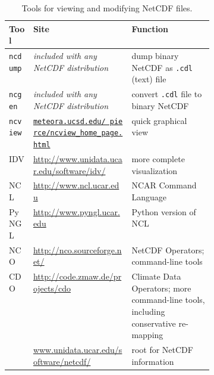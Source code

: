 \newcommand{\netcdftool}[1]{#1\index{NetCDF!tools!#1}}
\begin{table}[ht]
\centering
\small
\begin{tabular}{llp{0.4\linewidth}}
  \toprule
  \textbf{Tool} & \textbf{Site} & \textbf{Function} \\
  \midrule
  \netcdftool{\texttt{ncdump}} & \emph{included with any NetCDF distribution} & dump binary NetCDF as \texttt{.cdl} (text) file \\
  \netcdftool{\texttt{ncgen}} & \emph{included with any NetCDF distribution} & convert \texttt{.cdl} file to binary NetCDF \\
  \netcdftool{\texttt{ncview}} & \href{http://meteora.ucsd.edu/~pierce/ncview_home_page.html}{\texttt{meteora.ucsd.edu/~pierce/ncview_home_page.html}} & quick graphical view \\
  \netcdftool{IDV} & \url{http://www.unidata.ucar.edu/software/idv/} & more complete visualization \\
  \netcdftool{NCL} &  \url{http://www.ncl.ucar.edu} & NCAR Command Language\\
  \netcdftool{PyNGL} &  \url{http://www.pyngl.ucar.edu} & Python version of NCL\\
  \netcdftool{NCO}\index{NCO (NetCDF Operators)} & \url{http://nco.sourceforge.net/} & NetCDF Operators; command-line tools\\
  \netcdftool{CDO} & \url{http://code.zmaw.de/projects/cdo} & Climate Data Operators; more command-line tools, including conservative re-mapping \\
  & \url{www.unidata.ucar.edu/software/netcdf/} & root for NetCDF information \\
  \bottomrule
\end{tabular}
\normalsize
\label{tab:NetCDFview}
\caption{Tools for viewing and modifying NetCDF files.}
\end{table}




